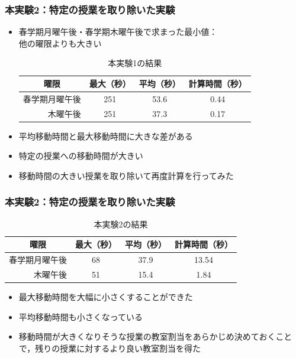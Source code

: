 \documentclass[dvipdfmx,12pt]{beamer}
\begin{document}
\begin{frame}\frametitle{本実験2：特定の授業を取り除いた実験}
\begin{itemize}
\item 春学期月曜午後・春学期木曜午後で求まった最小値：\\他の曜限よりも大きい
\vspace{-10pt}

\begin{table}[H]
\caption{本実験1の結果}
\vspace{-5pt}
\begin{center}
\begin{tabular}{|r|ccc|}
\hline
 \multicolumn{1}{|c|}{曜限} &  最大（秒）  & 平均（秒） & 計算時間（秒）\\
\hline
春学期月曜午後  & 251 & 53.6 &  0.44\\
木曜午後        & 251 & 37.3 &  0.17\\
\hline
\end{tabular}
\end{center}
\end{table}

\item 平均移動時間と最大移動時間に大きな差がある
\item 特定の授業への移動時間が大きい
\item 移動時間の大きい授業を取り除いて再度計算を行ってみた
\end{itemize}

\end{frame}

\begin{frame}\frametitle{本実験2：特定の授業を取り除いた実験}
\begin{table}[H]
\caption{本実験2の結果}
\vspace{-5.0pt}
\begin{center}
\begin{tabular}{|r|ccc|}
\hline
\multicolumn{1}{|c|}{曜限} & 最大（秒） & 平均（秒） & 計算時間（秒）\\
\hline
春学期月曜午後  & 68 & 37.9 & 13.54\\
      木曜午後  & 51 & 15.4 & 1.84\\
\hline
\end{tabular}
\end{center}
\end{table}
\begin{itemize}
\item 最大移動時間を大幅に小さくすることができた
\item 平均移動時間も小さくなっている
\item 移動時間が大きくなりそうな授業の教室割当をあらかじめ決めておくことで，残りの授業に対するより良い教室割当を得た

\end{itemize}
\end{frame}
\end{document}
